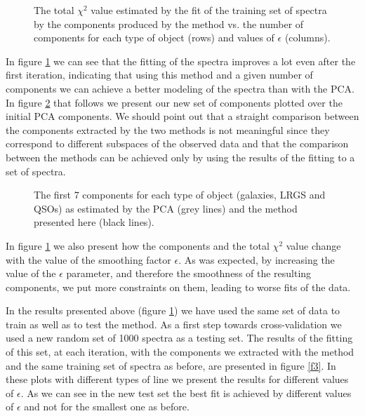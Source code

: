 \documentclass[apj]{emulateapj}
\begin{document}
\begin{figure}[h]
\caption{The total $\chi^2$ value estimated by the fit of the training set of spectra by the components produced by the method vs. the number of components for each type of object (rows) and values of $\epsilon$ (columns).}
\label{f1}
\end{figure}

In figure \ref{f1} we can see that the fitting of the spectra improves a lot even after the first iteration, indicating that using this method and a given number of components we can achieve a better modeling of the spectra than with the PCA. In figure \ref{f2} that follows we present our new set of components plotted over the initial PCA components. We should point out that a straight comparison between the components extracted by the two methods is not meaningful since they correspond to different subspaces of the observed data and that the comparison between the methods can be achieved only by using the results of the fitting to a set of spectra.

\begin{figure}[h]
\begin{center}
\caption{The first 7 components for each type of object (galaxies, LRGS and QSOs) as estimated by the PCA (grey lines) and the method presented here (black lines).}
\label{f2}
\end{center}
\end{figure}

In figure \ref{f1} we also present how the components and the total $\chi^2$ value change with the value of the smoothing factor $\epsilon$. As was expected, by increasing the value of the $\epsilon$ parameter, and therefore the smoothness of the resulting components, we put more constraints on them, leading to worse fits of the data.

In the results presented above (figure \ref{f1}) we have used the same set of data to train as well as to test the method. As a first step towards cross-validation we used a new random set of 1000 spectra as a testing set. The results of the fitting of this set, at each iteration, with the components we extracted with the method and the same training set of spectra as before, are presented in figure \ref{f3}. In these plots with different types of line we present the results for different values of $\epsilon$. As we can see in the new test set the best fit is achieved by different values of $\epsilon$ and not for the smallest one as before.
\end{document}
